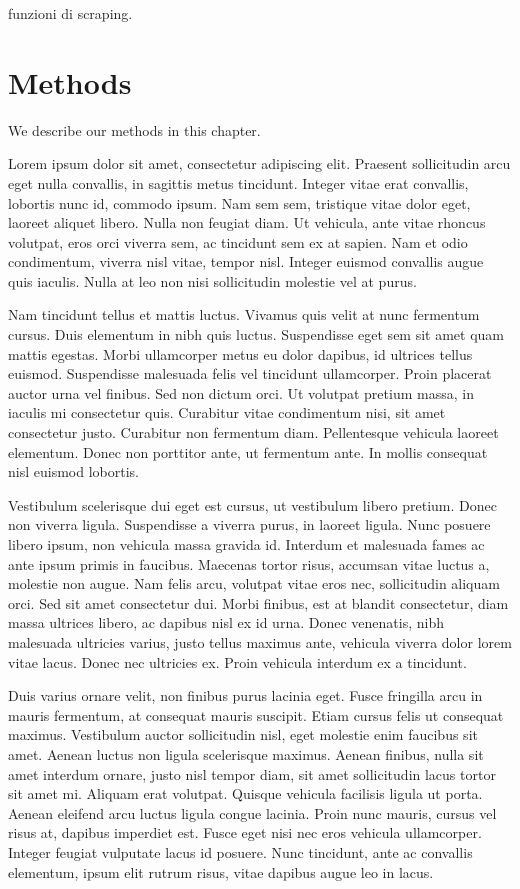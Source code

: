 \documentclass[
  12pt,
  a4paper,
  oneside]{book}
\begin{document}
funzioni di scraping.

\hypertarget{methods}{%
\chapter{Methods}\label{methods}}

We describe our methods in this chapter.

Lorem ipsum dolor sit amet, consectetur adipiscing elit. Praesent sollicitudin arcu eget nulla convallis, in sagittis metus tincidunt. Integer vitae erat convallis, lobortis nunc id, commodo ipsum. Nam sem sem, tristique vitae dolor eget, laoreet aliquet libero. Nulla non feugiat diam. Ut vehicula, ante vitae rhoncus volutpat, eros orci viverra sem, ac tincidunt sem ex at sapien. Nam et odio condimentum, viverra nisl vitae, tempor nisl. Integer euismod convallis augue quis iaculis. Nulla at leo non nisi sollicitudin molestie vel at purus.

Nam tincidunt tellus et mattis luctus. Vivamus quis velit at nunc fermentum cursus. Duis elementum in nibh quis luctus. Suspendisse eget sem sit amet quam mattis egestas. Morbi ullamcorper metus eu dolor dapibus, id ultrices tellus euismod. Suspendisse malesuada felis vel tincidunt ullamcorper. Proin placerat auctor urna vel finibus. Sed non dictum orci. Ut volutpat pretium massa, in iaculis mi consectetur quis. Curabitur vitae condimentum nisi, sit amet consectetur justo. Curabitur non fermentum diam. Pellentesque vehicula laoreet elementum. Donec non porttitor ante, ut fermentum ante. In mollis consequat nisl euismod lobortis.

Vestibulum scelerisque dui eget est cursus, ut vestibulum libero pretium. Donec non viverra ligula. Suspendisse a viverra purus, in laoreet ligula. Nunc posuere libero ipsum, non vehicula massa gravida id. Interdum et malesuada fames ac ante ipsum primis in faucibus. Maecenas tortor risus, accumsan vitae luctus a, molestie non augue. Nam felis arcu, volutpat vitae eros nec, sollicitudin aliquam orci. Sed sit amet consectetur dui. Morbi finibus, est at blandit consectetur, diam massa ultrices libero, ac dapibus nisl ex id urna. Donec venenatis, nibh malesuada ultricies varius, justo tellus maximus ante, vehicula viverra dolor lorem vitae lacus. Donec nec ultricies ex. Proin vehicula interdum ex a tincidunt.

Duis varius ornare velit, non finibus purus lacinia eget. Fusce fringilla arcu in mauris fermentum, at consequat mauris suscipit. Etiam cursus felis ut consequat maximus. Vestibulum auctor sollicitudin nisl, eget molestie enim faucibus sit amet. Aenean luctus non ligula scelerisque maximus. Aenean finibus, nulla sit amet interdum ornare, justo nisl tempor diam, sit amet sollicitudin lacus tortor sit amet mi. Aliquam erat volutpat. Quisque vehicula facilisis ligula ut porta. Aenean eleifend arcu luctus ligula congue lacinia. Proin nunc mauris, cursus vel risus at, dapibus imperdiet est. Fusce eget nisi nec eros vehicula ullamcorper. Integer feugiat vulputate lacus id posuere. Nunc tincidunt, ante ac convallis elementum, ipsum elit rutrum risus, vitae dapibus augue leo in lacus.
\end{document}
